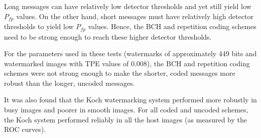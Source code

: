 \documentclass[12pt]{report}
\begin{document}
Long messages can have relatively low detector thresholds and yet still yield low $P_{fp}$ values.
On the other hand, short messages must have relatively high detector thresholds to yield low $P_{fp}$ values.
Hence, the BCH and repetition coding schemes need to be strong enough to reach these higher detector thresholds.

For the parameters used in these tests (watermarks of approximately 449 bits and watermarked images with TPE 
values of 0.008), the BCH and repetition coding schemes were not strong enough 
to make the shorter, coded messages more robust than the longer, uncoded messages.

It was also found that the Koch watermarking 
system performed more robustly in busy images and poorer in smooth images.
For all coded and uncoded schemes, the Koch system performed reliably in all the host images (as measured by the 
ROC curves).
\end{document}
